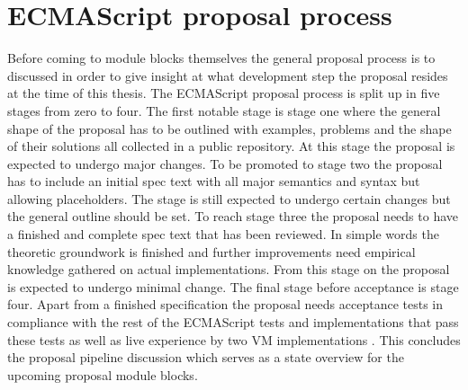 \section{ECMAScript proposal process}
Before coming to module blocks themselves the general proposal process is to discussed in order to give insight at what development step the proposal resides at the time of this thesis. The ECMAScript proposal process \cite{ecmaProp} is split up in five stages from zero to four. The first notable stage is stage one where the general shape of the proposal has to be outlined with examples, problems and the shape of their solutions all collected in a public repository. At this stage the proposal is expected to undergo major changes. To be promoted to stage two the proposal has to include an initial spec text with all major semantics and syntax but allowing placeholders. The stage is still expected to undergo certain changes but the general outline should be set. To reach stage three the proposal needs to have a finished and complete spec text that has been reviewed. In simple words the theoretic groundwork is finished and further improvements need empirical knowledge gathered on actual implementations. From this stage on the proposal is expected to undergo minimal change. The final stage before acceptance is stage four. Apart from a finished specification the proposal needs acceptance tests in compliance with the rest of the ECMAScript tests and implementations that pass these tests as well as live experience by two VM implementations \cite{ecmaProp}. This concludes the proposal pipeline discussion which serves as a state overview for the upcoming proposal module blocks.

